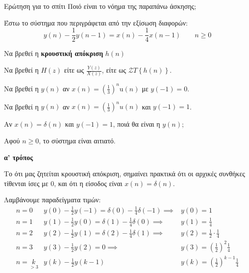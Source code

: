\documentclass[11pt,a4paper,notitlepage,fleqn]{article}
\begin{document}
\begin{questionbox}{Ερώτηση για το σπίτι}
	Ποιό είναι το νόημα της παραπάνω άσκησης;
\end{questionbox}

\begin{exercise}
	Έστω το σύστημα που περιγράφεται από την εξίσωση διαφορών:
	\[
	y(n) - \frac{1}{2}y(n-1) = x(n) - \frac{1}{4}x(n-1) \qquad n\geq0
	\]
	
	\begin{enumpar}
		\item Να βρεθεί η \textbf{κρουστική απόκριση} \( h(n) \)
		\item Να βρεθεί η \( H(z)\) είτε ως \( \frac{Y(z)}{X(z)} \), είτε ως \( \mathcal{Z}T\left\lbrace h(n) \right\rbrace \).
		\item Να βρεθεί η \( y(n) \) αν \( \displaystyle x(n) = \left(\frac{1}{3}\right)^n \mathrm{u}(n) \) με \( y(-1) = 0 \).
		\item Να βρεθεί η \( y(n) \) αν \( x(n) = \left(\frac{1}{3}\right)^n u(n) \) και
		\( y(-1) = 1 \).
		\item Αν \( x(n) = δ(n) \) και \( y(-1) = 1 \), ποιά θα είναι η \( y(n) \);
	\end{enumpar}
	\tcblower
	Αφού \( n \geq 0 \), το σύστημα είναι αιτιατό.
	\begin{enumpar}
		\item
		\begin{enumgreekpar}
			\item \textbf{α' τρόπος}
			
			Το ότι μας ζητείται κρουστική απόκριση, σημαίνει πρακτικά ότι οι αρχικές συνθήκες τίθενται ίσες με 0, και ότι η είσοδος είναι \( x(n)=δ(n) \).
			
			Λαμβάνουμε παραδείγματα τιμών:\[
			\begin{array}{crl}
			n=0 & y(0)-\frac{1}{2}y(-1)=\delta(0)-\frac{1}{4}δ(-1) \implies & y(0)=1\\
			n=1 & y(1)-\frac{1}{2}y(0) =δ(1)-\frac{1}{4}δ(0)\implies & y(1)=\frac{1}{4}\\
			n=2 & y(2)-\frac{1}{2}y(1) = δ(2)-\frac{1}{4}δ(1)\implies & y(2) = \frac{1}{2}\cdot\frac{1}{4}\\
			n=3 & y(3)-\frac{1}{2}y(2) = 0 \implies & y(3) = \left(\frac{1}{2}\right)^{2}\frac{1}{4}\\
			n=\underset{>3}{k} & y(k)-\frac{1}{2}y(k-1) & y(k) = \left(\frac{1}{2}\right)^{k-1}\frac{1}{4}
			\end{array}
			\]
			

\end{enumgreekpar}
\end{enumpar}
\end{exercise}
\end{document}
